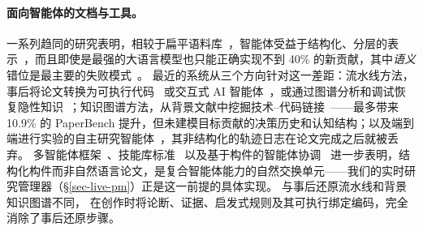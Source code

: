 \paragraph{面向智能体的文档与工具。}
一系列趋同的研究表明，相较于扁平语料库~\citep{lo2020s2orc, priem2022openalex}，智能体受益于结构化、分层的表示~\citep{openai2025agentsmd, vasilopoulos2026codifiedcontext}，而且即使是最强的大语言模型也只能正确实现不到 40\% 的新贡献，其中\emph{语义}错位是最主要的失败模式~\citep{jimenez2024swebench, chen2025scienceagentbench, hua2025researchcodebench}。
最近的系统从三个方向针对这一差距：流水线方法，事后将论文转换为可执行代码~\citep{seo2025papercoder} 或交互式 AI 智能体~\citep{miao2025paper2agent}，或通过图谱分析和调试恢复隐性知识~\citep{li2026tacit}；知识图谱方法，从背景文献中挖掘技术--代码链接~\citep{liu2026knowledgegraphs, luo2025xkg}——最多带来 10.9\% 的 PaperBench 提升，但未建模目标贡献的决策历史和认知结构；以及端到端进行实验的自主研究智能体~\citep{boiko2023coscientist, bran2024chemcrow, schmidgall2025agentlab, baek2025researchagent}，其非结构化的轨迹日志在论文完成之后就被丢弃。
多智能体框架~\citep{wu2024autogen}、技能库标准~\citep{wang2023voyager, agentskills2025} 以及基于构件的智能体协调~\citep{wang2026scienceclaw} 进一步表明，结构化构件而非自然语言论文，是复合智能体能力的自然交换单元——我们的实时研究管理器（\S\ref{sec-live-pm}）正是这一前提的具体实现。
与事后还原流水线和背景知识图谱不同，\ara{} 在创作时将论断、证据、启发式规则及其可执行绑定编码，完全消除了事后还原步骤。
